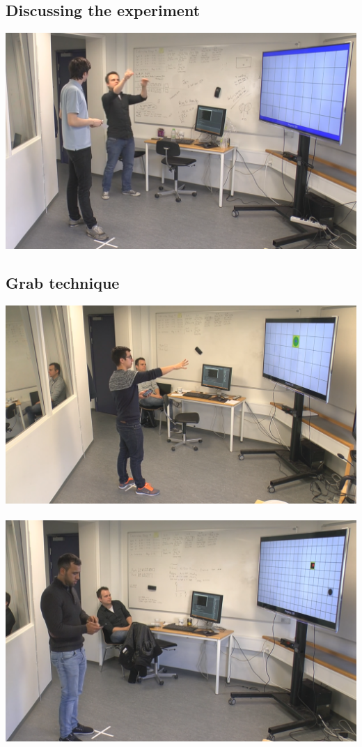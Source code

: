\subsection*{Discussing the experiment}
\includegraphics[width=\textwidth]{docs/appendix/files/discussion.png}

\subsection*{Grab technique}
\includegraphics[width=\textwidth]{docs/appendix/files/grab_push.png}
\\\\
\includegraphics[width=\textwidth]{docs/appendix/files/grab_pull.png}

